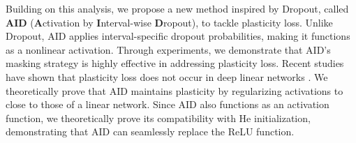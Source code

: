 Building on this analysis, we propose a new method inspired by Dropout, called \textbf{AID} (\textbf{A}ctivation by \textbf{I}nterval-wise \textbf{D}ropout), to tackle plasticity loss.
Unlike Dropout, AID applies interval-specific dropout probabilities, making it functions as a nonlinear activation.
Through experiments, we demonstrate that AID's masking strategy is highly effective in addressing plasticity loss.
Recent studies have shown that plasticity loss does not occur in deep linear networks \cite{lewandowski2023curvature, lewandowski2024plastic, dohare2024loss}.
We theoretically prove that AID maintains plasticity by regularizing activations to close to those of a linear network. 
Since AID also functions as an activation function, we theoretically prove its compatibility with He initialization, demonstrating that AID can seamlessly replace the ReLU function.

